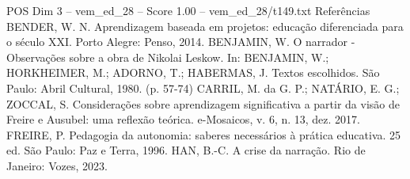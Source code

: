 \begin{textsample}{POS Dim 3 – vem\_ed\_28 – Score 1.00 – vem\_ed\_28/t149.txt}
Referências BENDER, W.
N.
Aprendizagem baseada em projetos: educação diferenciada para o século XXI.
Porto Alegre: Penso, 2014.
BENJAMIN, W.
O narrador - Observações sobre a obra de Nikolai Leskow.
In: BENJAMIN, W.; HORKHEIMER, M.; ADORNO, T.; HABERMAS, J.
Textos escolhidos.
São Paulo: Abril Cultural, 1980. (p. 57-74) CARRIL, M. da G.
P.; NATÁRIO, E.
G.; ZOCCAL, S.
Considerações sobre aprendizagem significativa a partir da visão de Freire e Ausubel: uma reflexão teórica. e-Mosaicos, v. 6, n. 13, dez. 2017.
FREIRE, P.
Pedagogia da autonomia: saberes necessários à prática educativa. 25 ed.
São Paulo: Paz e Terra, 1996.
HAN, B.-C.
A crise da narração.
Rio de Janeiro: Vozes, 2023.

\end{textsample}
